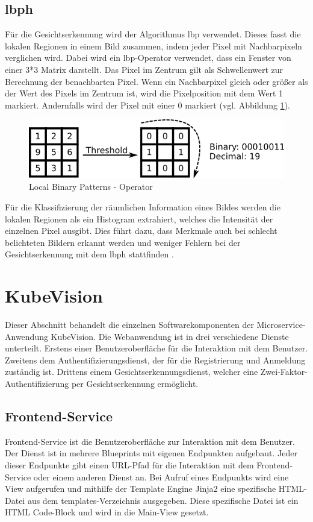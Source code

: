 \subsection{ \ac*{lbph} }
Für die Gesichtserkennung wird der Algorithmus \acs{lbp} verwendet.
Dieses fasst die lokalen Regionen in einem Bild zusammen, indem jeder Pixel mit Nachbarpixeln verglichen wird.
Dabei wird ein \acs{lbp}-Operator verwendet, dass ein Fenster von einer 3*3 Matrix darstellt.
Das Pixel im Zentrum gilt als Schwellenwert zur Berechnung der benachbarten Pixel.
Wenn ein Nachbarpixel gleich oder größer als der Wert des Pixels im Zentrum ist, wird die Pixelposition mit dem Wert 1 markiert.
Andernfalls wird der Pixel mit einer 0 markiert \cite{opencvlbp} (vgl. Abbildung \ref{fig:lbp}).

\begin{figure}[!htb]
  \centering
  \includegraphics[width=1.0\columnwidth]{images/lbp.png}
  \caption{Local Binary Patterns - Operator \cite{opencvlbp}}
  \label{fig:lbp}
\end{figure}

Für die Klassifizierung der räumlichen Information eines Bildes werden die lokalen Regionen als ein Histogram extrahiert, welches die Intensität der einzelnen Pixel ausgibt.
Dies führt dazu, dass Merkmale auch bei schlecht belichteten Bildern erkannt werden und weniger Fehlern bei der Gesichtserkennung mit dem \acs{lbph} stattfinden \cite{realtimefacerecog}.


\section{KubeVision}
Dieser Abschnitt behandelt die einzelnen Softwarekomponenten der Microservice-Anwendung KubeVision.
Die Webanwendung ist in drei verschiedene Dienste unterteilt.
Erstens einer Benutzeroberfläche für die Interaktion mit dem Benutzer.
Zweitens dem Authentifizierungsdienst, der für die Registrierung und Anmeldung zuständig ist.
Drittens einem Gesichtserkennungsdienst, welcher eine Zwei-Faktor-Authentifizierung per Gesichtserkennung ermöglicht.

\subsection{Frontend-Service}
Frontend-Service ist die Benutzeroberfläche zur Interaktion mit dem Benutzer.
Der Dienst ist in mehrere Blueprints mit eigenen Endpunkten aufgebaut.
Jeder dieser Endpunkte gibt einen URL-Pfad für die Interaktion mit dem Frontend-Service oder einem anderen Dienst an.
Bei Aufruf eines Endpunkts wird eine View aufgerufen und mithilfe der Template Engine Jinja2 eine spezifische HTML-Datei aus dem templates-Verzeichnis ausgegeben.
Diese spezifische Datei ist ein HTML Code-Block und wird in die Main-View gesetzt.

